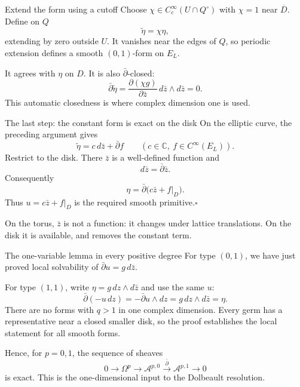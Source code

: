 \documentclass[aspectratio=169,11pt]{beamer}
\newcommand{\db}{\bar\partial}
\newcommand{\C}{\mathbb C}
\newcommand{\A}{\mathcal A}
\begin{document}
\begin{frame}{Extend the form using a cutoff}
Choose $\chi\in C_c^\infty(U\cap Q^\circ)$ with
$\chi=1$ near $\overline D$.
Define on $Q$
\[
 \widetilde\eta=\chi\eta,
\]
extending by zero outside $U$. It vanishes near the edges of $Q$, so
periodic extension defines a smooth $(0,1)$-form on $E_L$.

It agrees with $\eta$ on $D$. It is also $\db$-closed:
\[
 \db\widetilde\eta
 =\frac{\partial(\chi g)}{\partial\bar z}\,
 d\bar z\wedge d\bar z=0.
\]
This automatic closedness is where complex dimension one is used.
\end{frame}

\begin{frame}{The last step: the constant form is exact on the disk}
On the elliptic curve, the preceding argument gives
\[
 \widetilde\eta=c\,d\bar z+\db f
 \qquad(c\in\C,\ f\in C^\infty(E_L)).
\]
Restrict to the disk. There $\bar z$ is a well-defined function and
\[
 d\bar z=\db\bar z.
\]
Consequently
\[
 \eta=\db\bigl(c\bar z+f|_D\bigr).
\]
Thus $u=c\bar z+f|_D$ is the required smooth primitive.\hfill$\square$

On the torus, $\bar z$ is not a function: it changes under lattice
translations. On the disk it is available, and removes the constant term.
\end{frame}

\begin{frame}{The one-variable lemma in every positive degree}
For type $(0,1)$, we have just proved local solvability of
$\db u=g\,d\bar z$.

For type $(1,1)$, write $\eta=g\,dz\wedge d\bar z$ and use the same $u$:
\[
 \db(-u\,dz)
 =-\db u\wedge dz
 =g\,dz\wedge d\bar z=\eta.
\]
There are no forms with $q>1$ in one complex dimension.
Every germ has a representative near a closed smaller disk, so the proof
establishes the local statement for all smooth forms.

Hence, for $p=0,1$, the sequence of sheaves
\[
 0\longrightarrow\Omega^p\longrightarrow\A^{p,0}
 \xrightarrow{\db}\A^{p,1}\longrightarrow0
\]
is exact. This is the one-dimensional input to the Dolbeault resolution.
\end{frame}
\end{document}
